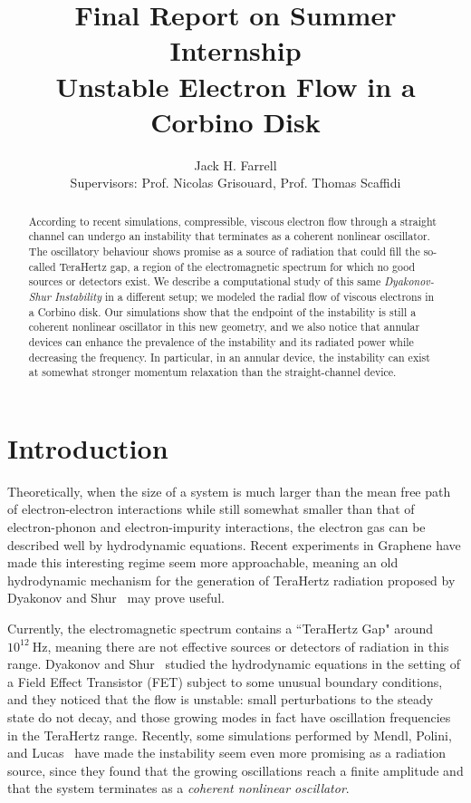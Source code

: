 \documentclass[12pt]{article}
\title{Final Report on Summer Internship \\
\large{Unstable Electron Flow in a Corbino Disk}}
\author{Jack H. Farrell \\ \small Supervisors: Prof. Nicolas Grisouard, Prof. Thomas Scaffidi}
\begin{document}
	
\begin{abstract}
According to recent simulations, compressible, viscous electron flow through a straight channel can undergo an instability that terminates as a coherent nonlinear oscillator.  The oscillatory behaviour shows promise as a source of radiation that could fill the so-called TeraHertz gap, a region of the electromagnetic spectrum for which no good sources or detectors exist.  We describe a computational study of this same \textit{Dyakonov-Shur Instability} in a different setup; we modeled the radial flow of viscous electrons in a Corbino disk.  Our simulations show that the endpoint of the instability is still a coherent nonlinear oscillator in this new geometry, and we also notice that annular devices can enhance the prevalence of the instability and its radiated power while decreasing the frequency.  In particular, in an annular device, the instability can exist at somewhat stronger momentum relaxation than the straight-channel device. 
\end{abstract}

\maketitle

\tableofcontents

\section{Introduction}
Theoretically, when the size of a system is much larger than the mean free path of electron-electron interactions while still somewhat smaller than that of electron-phonon and electron-impurity interactions, the electron gas can be described well by hydrodynamic equations.  Recent experiments in Graphene have made this interesting regime seem more approachable, meaning an old hydrodynamic mechanism for the generation of TeraHertz radiation proposed by Dyakonov and Shur~\cite{Dyakonov1993} may prove useful.  

Currently, the electromagnetic spectrum contains a ``TeraHertz Gap" around $10^{12}\ \text{Hz}$, meaning there are not effective sources or detectors of radiation in this range.  Dyakonov and Shur~\cite{Dyakonov1993} studied the hydrodynamic equations in the setting of a Field Effect Transistor (FET) subject to some unusual boundary conditions, and they noticed that the flow is unstable: small perturbations to the steady state do not decay, and those growing modes in fact have oscillation frequencies in the TeraHertz range.  Recently, some simulations performed by Mendl, Polini, and Lucas~\cite{Mendl2019} have made the instability seem even more promising as a radiation source, since they found that the growing oscillations reach a finite amplitude and that the system terminates as a \textit{coherent nonlinear oscillator}.  
\end{document}
